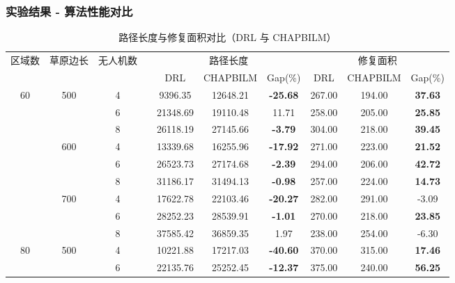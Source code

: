 \documentclass[9pt, aspectratio=169]{beamer}  %
\begin{document}
\begin{frame}
	\frametitle{实验结果 - 算法性能对比}
	\begin{table}
		\centering
		\caption{路径长度与修复面积对比（DRL 与 CHAPBILM）}
		\scriptsize
		\setlength{\tabcolsep}{2pt}
		\begin{tabular}{ccc c ccc ccc}
			\toprule
			\multirow{2}{*}{区域数} & \multirow{2}{*}{草原边长} & \multirow{2}{*}{无人机数} &  & \multicolumn{3}{c}{路径长度} & \multicolumn{3}{c}{修复面积} \\
			\cmidrule(lr){5-7}\cmidrule(lr){8-10}
			& & & & DRL & CHAPBILM & Gap(\%) & DRL & CHAPBILM & Gap(\%) \\
			\midrule
			\multirow{9}{*}{60} 
			 & \multirow{3}{*}{500} 
			   & \multirow{1}{*}{4} &  & 9396.35  & 12648.21 & \textbf{-25.68} & 267.00 & 194.00 & \textbf{37.63} \\
			 &                        & \multirow{1}{*}{6} &  & 21348.69 & 19110.48 & 11.71          & 258.00 & 205.00 & \textbf{25.85} \\
			 &                        & \multirow{1}{*}{8} &  & 26118.19 & 27145.66 & \textbf{-3.79} & 304.00 & 218.00 & \textbf{39.45} \\
			\cmidrule(lr){2-10}
			 & \multirow{3}{*}{600} 
			   & \multirow{1}{*}{4} &  & 13339.68 & 16255.96 & \textbf{-17.92} & 271.00 & 223.00 & \textbf{21.52} \\
			 &                        & \multirow{1}{*}{6} &  & 26523.73 & 27174.68 & \textbf{-2.39} & 294.00 & 206.00 & \textbf{42.72} \\
			 &                        & \multirow{1}{*}{8} &  & 31186.17 & 31494.13 & \textbf{-0.98} & 257.00 & 224.00 & \textbf{14.73} \\
			\cmidrule(lr){2-10}
			 & \multirow{3}{*}{700} 
			   & \multirow{1}{*}{4} &  & 17622.78 & 22103.46 & \textbf{-20.27} & 282.00 & 291.00 & -3.09          \\
			 &                        & \multirow{1}{*}{6} &  & 28252.23 & 28539.91 & \textbf{-1.01} & 270.00 & 218.00 & \textbf{23.85} \\
			 &                        & \multirow{1}{*}{8} &  & 37585.42 & 36859.35 & 1.97           & 238.00 & 254.00 & -6.30          \\
			\midrule
			\multirow{9}{*}{80} 
			 & \multirow{3}{*}{500} 
			   & \multirow{1}{*}{4} &  & 10221.88 & 17217.03 & \textbf{-40.60} & 370.00 & 315.00 & \textbf{17.46} \\
			 &                        & \multirow{1}{*}{6} &  & 22135.76 & 25252.45 & \textbf{-12.37} & 375.00 & 240.00 & \textbf{56.25} \\

\end{tabular}
\end{table}
\end{frame}
\end{document}

